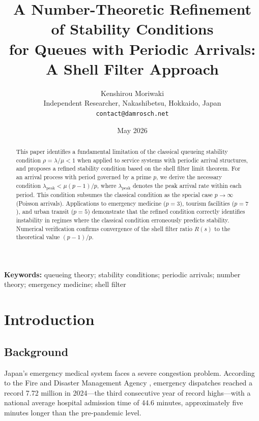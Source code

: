 \documentclass[12pt]{article}
\begin{document}
\title{A Number-Theoretic Refinement of Stability Conditions\\
for Queues with Periodic Arrivals:\\
A Shell Filter Approach}

\author{Kenshirou Moriwaki\\
\small Independent Researcher, Nakashibetsu, Hokkaido, Japan\\
\small \texttt{contact@damrosch.net}}

\date{May 2026}
\maketitle

\begin{abstract}
This paper identifies a fundamental limitation of the classical queueing 
stability condition $\rho = \lambda/\mu < 1$ when applied to service systems 
with periodic arrival structures, and proposes a refined stability condition 
based on the shell filter limit theorem. For an arrival process with period 
governed by a prime $p$, we derive the necessary condition 
$\lambda_{\mathrm{peak}} < \mu(p-1)/p$, where $\lambda_{\mathrm{peak}}$ 
denotes the peak arrival rate within each period. This condition subsumes 
the classical condition as the special case $p \to \infty$ (Poisson arrivals). 
Applications to emergency medicine ($p=3$), tourism facilities ($p=7$), and 
urban transit ($p=5$) demonstrate that the refined condition correctly 
identifies instability in regimes where the classical condition erroneously 
predicts stability. Numerical verification confirms convergence of the shell 
filter ratio $R(s)$ to the theoretical value $(p-1)/p$.
\end{abstract}

\textbf{Keywords:} queueing theory; stability conditions; periodic arrivals; 
number theory; emergency medicine; shell filter

\section{Introduction}

\subsection{Background}

Japan's emergency medical system faces a severe congestion problem.
According to the Fire and Disaster Management Agency
\citep{FDMA2025}, emergency dispatches reached a record 7.72 million 
in 2024---the third consecutive year of record highs---with a national 
average hospital admission time of 44.6 minutes, approximately five 
minutes longer than the pre-pandemic level.
\end{document}
